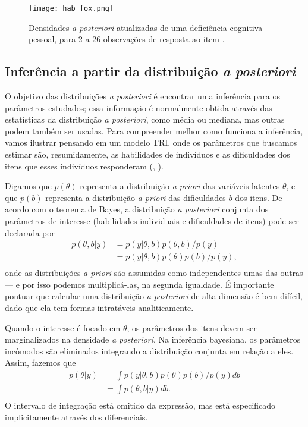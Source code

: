 \documentclass[
	12pt,				%
	openright,			%
	twoside,			%
	a4paper,			%
	english,			%
	brazil				%
	]{abntex2}
\begin{document}
 \begin{figure}[!htbp]
    \centering
    \texttt{[image: hab\_fox.png]}
    \caption{Densidades \emph{a posteriori} atualizadas de uma deficiência cognitiva pessoal, para 2 a 26 observações de resposta ao item \cite[p.~34]{fox2010}.}
    \label{fig:exemplommse}
 \end{figure}
 
 \subsection{Inferência a partir da distribuição \emph{a posteriori}}\label{posterioriintratavel}
 O objetivo das distribuições \textit{a posteriori} é encontrar uma inferência para os parâmetros estudados; essa informação é normalmente obtida através das estatísticas da distribuição \emph{a posteriori}, como média ou mediana, mas outras podem também ser usadas. Para compreender melhor como funciona a inferência, vamos ilustrar pensando em um modelo TRI, onde os parâmetros que buscamos estimar são, resumidamente, as habilidades de indivíduos e as dificuldades dos itens que esses indivíduos responderam (, \citeyear{gilks1996}).
 
 Digamos que $p(\theta)$ representa a distribuição \emph{a priori} das variáveis latentes $\theta$, e que $p(b)$ representa a distribuição \emph{a priori} das dificuldades $b$ dos itens. De acordo com o teorema de Bayes, a distribuição \emph{a posteriori} conjunta dos parâmetros de interesse (habilidades individuais e dificuldades de itens) pode ser declarada por
 \begin{equation}
    \begin{aligned}
        p(\theta, b | y) &= p(y | \theta, b) p(\theta, b)/p(y) \\
        &= p(y | \theta, b) p(\theta) p(b)/p(y), \\
     \end{aligned}
 \end{equation}
 onde as distribuições \emph{a priori} são assumidas como independentes umas das outras --- e por isso podemos multiplicá-las, na segunda igualdade. É importante pontuar que calcular uma distribuição \emph{a posteriori} de alta dimensão é bem difícil, dado que ela tem formas intratáveis analiticamente.
 
 Quando o interesse é focado em $\theta$, os parâmetros dos itens devem ser marginalizados na densidade \emph{a posteriori}. Na inferência bayesiana, os parâmetros incômodos são eliminados integrando a distribuição conjunta em relação a eles. Assim, fazemos que
 \begin{equation}
    \begin{aligned}
        p(\theta | y) &= \int p(y | \theta, b) p(\theta) p(b)/p(y) db \\
        &= \int p(\theta, b | y) db. \\
     \end{aligned}
 \end{equation}
 O intervalo de integração está omitido da expressão, mas está especificado implicitamente através dos diferenciais. 
\end{document}
